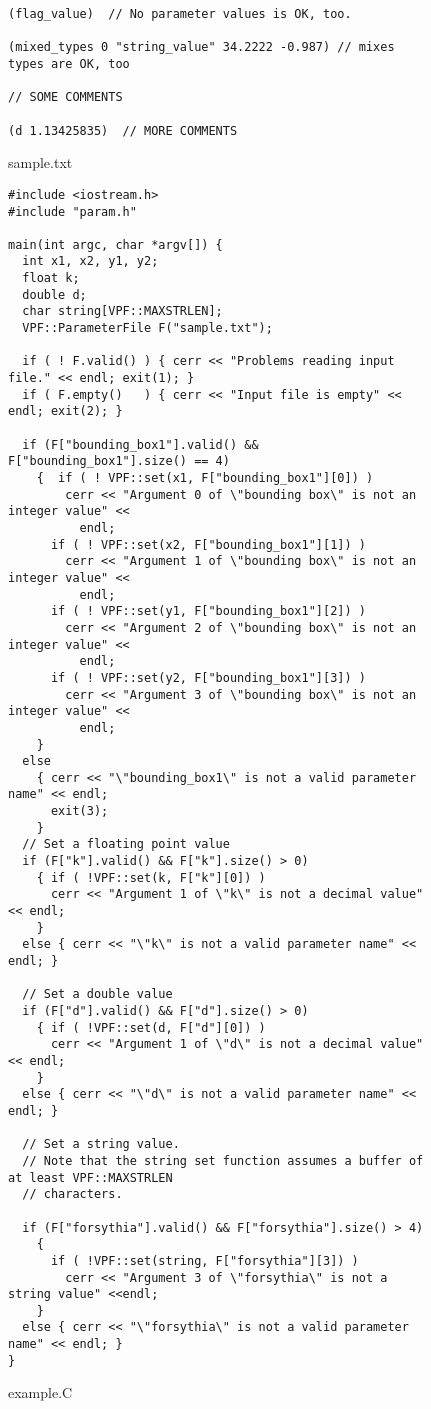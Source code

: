 \begin{appendix}
\begin{figure}
\begin{verbatim}
(flag_value)  // No parameter values is OK, too.

(mixed_types 0 "string_value" 34.2222 -0.987) // mixes types are OK, too

// SOME COMMENTS

(d 1.13425835)  // MORE COMMENTS
\end{verbatim}
\caption{sample.txt}
\label{samplefile}
\end{figure}

\begin{figure}
\footnotesize
\begin{verbatim}
#include <iostream.h>
#include "param.h"

main(int argc, char *argv[]) {
  int x1, x2, y1, y2;
  float k;
  double d;
  char string[VPF::MAXSTRLEN];
  VPF::ParameterFile F("sample.txt");

  if ( ! F.valid() ) { cerr << "Problems reading input file." << endl; exit(1); }
  if ( F.empty()   ) { cerr << "Input file is empty" << endl; exit(2); }
  
  if (F["bounding_box1"].valid() && F["bounding_box1"].size() == 4)
	{  if ( ! VPF::set(x1, F["bounding_box1"][0]) )
		cerr << "Argument 0 of \"bounding box\" is not an integer value" <<
		  endl;
	  if ( ! VPF::set(x2, F["bounding_box1"][1]) )
  		cerr << "Argument 1 of \"bounding box\" is not an integer value" <<
		  endl;
	  if ( ! VPF::set(y1, F["bounding_box1"][2]) )
  		cerr << "Argument 2 of \"bounding box\" is not an integer value" <<
		  endl;
	  if ( ! VPF::set(y2, F["bounding_box1"][3]) )
  		cerr << "Argument 3 of \"bounding box\" is not an integer value" <<
		  endl;
	}
  else
	{ cerr << "\"bounding_box1\" is not a valid parameter name" << endl;
	  exit(3);
	}
  // Set a floating point value
  if (F["k"].valid() && F["k"].size() > 0)
	{ if ( !VPF::set(k, F["k"][0]) )
	  cerr << "Argument 1 of \"k\" is not a decimal value" << endl;
	}
  else { cerr << "\"k\" is not a valid parameter name" << endl; }

  // Set a double value
  if (F["d"].valid() && F["d"].size() > 0)
	{ if ( !VPF::set(d, F["d"][0]) )
	  cerr << "Argument 1 of \"d\" is not a decimal value" << endl;
	}
  else { cerr << "\"d\" is not a valid parameter name" << endl; }

  // Set a string value.
  // Note that the string set function assumes a buffer of at least VPF::MAXSTRLEN
  // characters.
  
  if (F["forsythia"].valid() && F["forsythia"].size() > 4)
	{
	  if ( !VPF::set(string, F["forsythia"][3]) )
		cerr << "Argument 3 of \"forsythia\" is not a string value" <<endl;
	}
  else { cerr << "\"forsythia\" is not a valid parameter name" << endl; }
}
\end{verbatim}
\caption{example.C}
\label{samplecode}
\end{figure}


\end{appendix}

